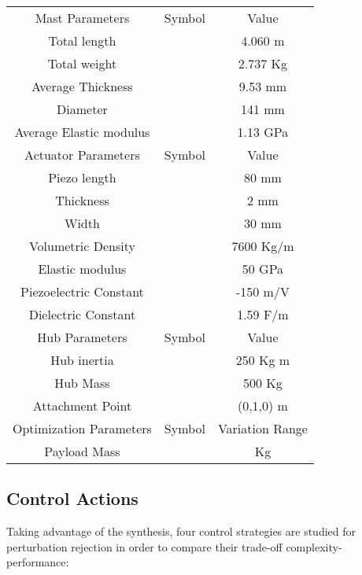 \documentclass{ifacconf}
\begin{document}
\begin{table}
\caption{}
\begin{center}
\label{tab:parameters}
\begin{tabular}{c c c}
& & \\ \hline
\hline
Mast Parameters & Symbol & Value\\
\hline
Total length &  & 4.060 m\\
Total weight&  & 2.737 Kg\\
Average Thickness &  & 9.53 mm \\
Diameter &  & 141 mm \\
Average Elastic modulus &  & 1.13 GPa \\
\hline
\hline
Actuator Parameters & Symbol & Value\\
\hline
Piezo length &  & 80 mm\\
Thickness &  & 2 mm \\
Width &  & 30 mm \\
Volumetric Density &  & 7600 Kg/m \\
Elastic modulus &  & 50 GPa \\
Piezoelectric Constant &  & -150 m/V \\
Dielectric Constant &  & 1.59 F/m \\
\hline
\hline
Hub Parameters & Symbol & Value\\
\hline
Hub inertia & & 250 Kg m\\
Hub Mass & & 500 Kg\\
Attachment Point & & (0,1,0) m \\
\hline
\hline
Optimization Parameters & Symbol & Variation Range\\
\hline
Payload Mass &  &  Kg \\
\hline
\hline
\end{tabular}
\end{center}
\end{table}

\subsection{Control Actions}

Taking advantage of the  synthesis, four control strategies are studied for perturbation rejection in order to compare their trade-off complexity-performance:
\end{document}

